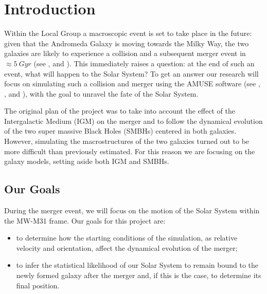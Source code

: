 \documentclass[a4paper,12pt, english]{article}
\begin{document}
\section{Introduction}
\label{introduction}
Within the Local Group a macroscopic event is set to take place in the future: given that the Andromeda Galaxy is moving towards the Milky Way, the two galaxies are likely to experience a collision and a subsequent merger event in \(\approx 5\: Gyr\) (see \textcite{Cox_2008}, \textcite{van_der_Marel_2019} and \textcite{Schiavi_2019}). This immediately raises a question: at the end of such an event, what will happen to the Solar System? To get an answer our research will focus on simulating such a collision and merger using the AMUSE software (see \textcite{Portegies_Zwart_McMillan_2018}, \textcite{Portegies_Zwart_2013}, \textcite{Pelupessy_2013} and \textcite{Portegies_Zwart_2009}), with the goal to unravel the fate of the Solar System.\par
\smallskip
The original plan of the project was to take into account the effect of the Intergalactic Medium (IGM) on the merger and to follow the dynamical evolution of the two super massive Black Holes (SMBHs) centered in both galaxies. However, simulating the macrostructures of the two galaxies turned out to be more difficult than previously estimated. For this reason we are focusing on the galaxy models, setting aside both IGM and SMBHs.\par 
\smallskip

\subsection{Our Goals}
\label{goals}
During the merger event, we will focus on the motion of the Solar System within the MW-M31 frame. Our goals for this project are: 
\begin{itemize}
    \item to determine how the starting conditions of the simulation, as relative velocity and orientation, affect the dynamical evolution of the merger;
    \item to infer the statistical likelihood of our Solar System to remain bound to the newly formed galaxy after the merger and, if this is the case, to determine its final position.
\end{itemize}
\par\smallskip
\end{document}
